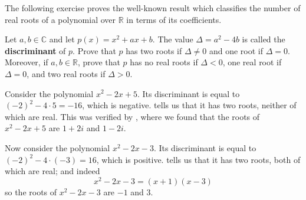 The following exercise proves the well-known result which classifies the number of real roots of a polynomial over $\mathbb{R}$ in terms of its coefficients.

\begin{exercise}
\label{exDiscriminantRealRoots}
Let $a,b \in \mathbb{C}$ and let $p(x)=x^2+ax+b$. The value $\Delta=a^2-4b$ is called the \textbf{discriminant} of $p$. Prove that $p$ has two roots if $\Delta \ne 0$ and one root if $\Delta = 0$. Moreover, if $a,b \in \mathbb{R}$, prove that $p$ has no real roots if $\Delta < 0$, one real root if $\Delta = 0$, and two real roots if $\Delta > 0$.
\end{exercise}

\begin{example}
Consider the polynomial $x^2-2x+5$. Its discriminant is equal to $(-2)^2-4 \cdot 5 = -16$, which is negative.  tells us that it has two roots, neither of which are real. This was verified by , where we found that the roots of $x^2-2x+5$ are $1+2i$ and $1-2i$.

Now consider the polynomial $x^2-2x-3$. Its discriminant is equal to $(-2)^2-4\cdot(-3) = 16$, which is positive.  tells us that it has two roots, both of which are real; and indeed
\[ x^2-2x-3 = (x+1)(x-3) \]
so the roots of $x^2-2x-3$ are $-1$ and $3$.
\end{example}